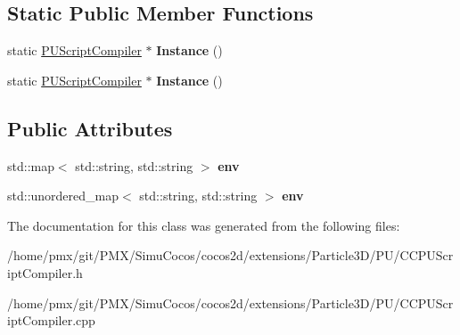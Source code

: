 \subsection*{Static Public Member Functions}
\begin{DoxyCompactItemize}
\item 
\mbox{\label{classPUScriptCompiler_ac120343a3abe7a048c2a099a54104e2b}} 
static \hyperlink{classPUScriptCompiler}{P\+U\+Script\+Compiler} $\ast$ {\bfseries Instance} ()
\item 
\mbox{\label{classPUScriptCompiler_a592a74ce278457400c6fa55e664d0ab1}} 
static \hyperlink{classPUScriptCompiler}{P\+U\+Script\+Compiler} $\ast$ {\bfseries Instance} ()
\end{DoxyCompactItemize}
\subsection*{Public Attributes}
\begin{DoxyCompactItemize}
\item 
\mbox{\label{classPUScriptCompiler_ac18fa273a44ff4a7181f5c9e35b0195e}} 
std\+::map$<$ std\+::string, std\+::string $>$ {\bfseries env}
\item 
\mbox{\label{classPUScriptCompiler_a061103107bcd2eff34915921b473ff57}} 
std\+::unordered\+\_\+map$<$ std\+::string, std\+::string $>$ {\bfseries env}
\end{DoxyCompactItemize}


The documentation for this class was generated from the following files\+:\begin{DoxyCompactItemize}
\item 
/home/pmx/git/\+P\+M\+X/\+Simu\+Cocos/cocos2d/extensions/\+Particle3\+D/\+P\+U/C\+C\+P\+U\+Script\+Compiler.\+h\item 
/home/pmx/git/\+P\+M\+X/\+Simu\+Cocos/cocos2d/extensions/\+Particle3\+D/\+P\+U/C\+C\+P\+U\+Script\+Compiler.\+cpp\end{DoxyCompactItemize}
